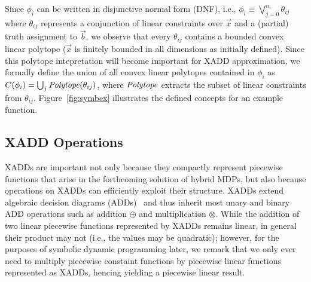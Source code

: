 %

%
Since $\phi_i$ can be written in disjunctive normal form (DNF), i.e.,
$\phi_i \equiv \bigvee_{j=0}^{n_i} \theta_{ij}$ where $\theta_{ij}$
represents a conjunction of linear constraints over $\vec{x}$ and a
(partial) truth assignment to $\vec{b}$, we observe that every
$\theta_{ij}$ contains a bounded convex linear polytope ($\vec{x}$ is
finitely bounded in all dimensions as initially defined).  Since this
polytope intepretation will become important for XADD approximation,
we formally define the union of all convex linear polytopes contained in 
$\phi_i$ as
$C(\phi_i) = \bigcup_j \mathit{Polytope}(\theta_{ij})$, 
where $\mathit{Polytope}$ extracts the subset of linear constraints from
$\theta_{ij}$. Figure~\ref{fig:symbex} illustrates the defined concepts for an example function.

\subsection{XADD Operations} 

XADDs are important not only because they compactly represent
piecewise functions that arise in the forthcoming solution of hybrid
MDPs, but also because operations on XADDs can efficiently exploit
their structure.  XADDs extend algebraic decision diagrams
(ADDs)~\cite{bahar93add} and thus inherit most unary and binary ADD
operations such as addition $\oplus$ and multiplication $\otimes$.
While the addition of two linear piecewise functions represented by
XADDs remains linear, in general their product may not (i.e., the values
may be quadratic); however, for the purposes of symbolic dynamic
programming later, we remark that we only ever need to multiply
piecewise constaint functions by piecewise linear functions
represented as XADDs, hencing yielding a piecewise linear result.

